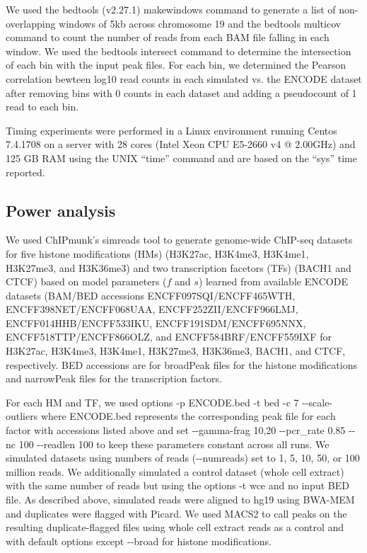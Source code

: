 \documentclass[12pt]{article}
\begin{document}
We used the bedtools \cite{bedtools} (v2.27.1) makewindows command to generate a list of non-overlapping windows of 5kb across chromosome 19 and the bedtools multicov command to count the number of reads from each BAM file falling in each window. We used the bedtools intersect command to determine the intersection of each bin with the input peak files. For each bin, we determined the Pearson correlation bewteen log10 read counts in each simulated vs. the ENCODE dataset after removing bins with 0 counts in each dataset and adding a pseudocount of 1 read to each bin.

Timing experiments were performed in a Linux environment running Centos 7.4.1708 on a server with 28 cores (Intel\textsuperscript{\textregistered} Xeon\textsuperscript{\textregistered} CPU E5-2660 v4 @ 2.00GHz) and 125 GB RAM using the UNIX ``time'' command and are based on the ``sys'' time reported. %


\subsection*{Power analysis}
We used ChIPmunk's simreads tool to generate genome-wide ChIP-seq datasets for five histone modifications (HMs) (H3K27ac, H3K4me3, H3K4me1, H3K27me3, and H3K36me3) and two transcription facetors (TFs) (BACH1 and CTCF) based on model parameters ($f$ and $s$) learned from available ENCODE datasets (BAM/BED accessions ENCFF097SQI/ENCFF465WTH, ENCFF398NET/ENCFF068UAA, ENCFF252ZII/ENCFF966LMJ, ENCFF014HHB/ENCFF533IKU, ENCFF191SDM/ENCFF695NNX, ENCFF518TTP/ENCFF866OLZ, and ENCFF584BRF/ENCFF559IXF for H3K27ac, H3K4me3, H3K4me1, H3K27me3, H3K36me3, BACH1, and CTCF, respectively. BED accessions are for broadPeak files for the histone modifications and narrowPeak files for the transcription factors.

For each HM and TF, we used options -p ENCODE.bed -t bed -c 7 -{}-scale-outliers where ENCODE.bed represents the corresponding peak file for each factor with accessions listed above and set -{}-gamma-frag 10,20 -{}-pcr\_rate 0.85 -{}-nc 100 -{}-readlen 100 to keep these parameters constant across all runs.
We simulated datasets using numbers of reads (-{}-numreads) set to 1, 5, 10, 50, or 100 million reads.
We additionally simulated a control dataset (whole cell extract) with the same number of reads but using the options -t wce and no input BED file. As described above, simulated reads were aligned to hg19 using BWA-MEM and duplicates were flagged with Picard.
We used MACS2 \cite{MACS2} to call peaks on the resulting duplicate-flagged files using whole cell extract reads as a control and with default options except -{}-broad for histone modifications.
\end{document}
